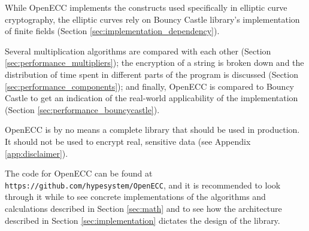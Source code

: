 While OpenECC implements the constructs used specifically in elliptic curve cryptography, the elliptic curves rely on
Bouncy Castle library's implementation of finite fields (Section \ref{sec:implementation_dependency}).

Several multiplication algorithms are compared with each other (Section \ref{sec:performance_multipliers});
the encryption of a string is broken down and the distribution of time spent in different parts of the program
is discussed (Section \ref{sec:performance_components}); and finally, OpenECC is compared to Bouncy Castle to
get an indication of the real-world applicability of the implementation (Section \ref{sec:performance_bouncycastle}).

OpenECC is by no means a complete library that should be used in production. It should not be used to encrypt real,
sensitive data (see Appendix \ref{app:disclaimer}).

The code for OpenECC can be found at \texttt{https://github.com/hypesystem/OpenECC}, and it is recommended to look
through it while to see concrete implementations of the algorithms and calculations described in Section
\ref{sec:math} and to see how the architecture described in Section \ref{sec:implementation} dictates the design
of the library.